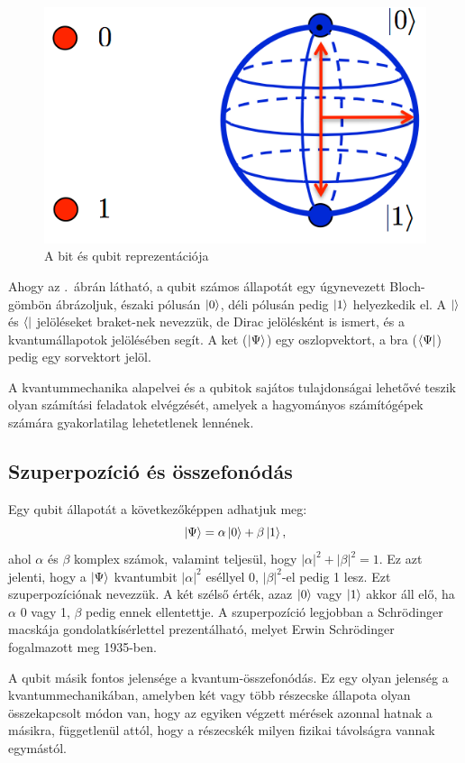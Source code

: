 \documentclass[
]{thesis-ekf}
\theoremstyle{definition}
\theoremstyle{remark}
\begin{document}
\begin{figure}[H]
	\centering
	\includegraphics[width=0.3\linewidth]{bitQubit}
	\caption{A bit és qubit reprezentációja}
	\label{fig:bitqubit}
\end{figure}

Ahogy az \az{\ref{fig:bitqubit}}.~ábrán látható, a qubit számos állapotát egy úgynevezett Bloch-gömbön ábrázoljuk, északi pólusán $\ket{0}$, déli pólusán pedig $\ket{1}$ helyezkedik el. A $\ket{}$ és $\bra{}$ jelöléseket braket-nek nevezzük, de Dirac jelölésként is ismert, és a kvantumállapotok jelölésében segít. A ket ($\ket{\Psi}$) egy oszlopvektort, a bra ($\bra{\Psi}$) pedig egy sorvektort jelöl.\cite{Chris Bernhardt}

A kvantummechanika alapelvei és a qubitok sajátos tulajdonságai lehetővé teszik
olyan számítási feladatok elvégzését, amelyek a hagyományos számítógépek számára gyakorlatilag lehetetlenek lennének.

\subsection{Szuperpozíció és összefonódás}

Egy qubit állapotát a következőképpen adhatjuk meg:
\begin{equation}\label{qubitallapot}
	\ket{\Psi}=\alpha\ket{0}+\beta\ket{1},
\end{equation}
ahol $\alpha$ és $\beta$ komplex számok, valamint teljesül, hogy $|\alpha|^2+|\beta|^2=1$. Ez azt jelenti, hogy a $\ket{\Psi}$ kvantumbit $|\alpha|^2$ eséllyel 0, $|\beta|^2$-el pedig 1 lesz. Ezt szuperpozíciónak nevezzük. A két szélső érték, azaz $\ket{0}$ vagy $\ket{1}$ akkor áll elő, ha $\alpha$ 0 vagy 1, $\beta$ pedig ennek ellentettje. A szuperpozíció legjobban a Schrödinger macskája gondolatkísérlettel prezentálható, melyet Erwin Schrödinger fogalmazott meg 1935-ben.\cite{Geszti Tamás,LandauLifsic}

A qubit másik fontos jelensége a kvantum-összefonódás. Ez egy olyan jelenség a kvantummechanikában, amelyben két vagy több részecske állapota olyan összekapcsolt módon van, hogy az egyiken végzett mérések azonnal hatnak a másikra, függetlenül attól, hogy a részecskék milyen fizikai távolságra vannak egymástól.\cite{Chris Bernhardt}
\end{document}
